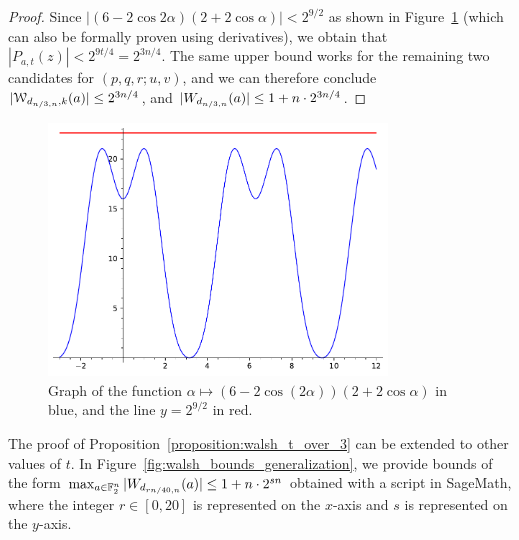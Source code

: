 \documentclass[11pt]{llncs}
\begin{document}
\begin{proof}
    
    Since $|(6-2\cos2\alpha)(2+2\cos\alpha)|<2^{9/2}$ as shown in Figure~\ref{fig:trigo_bound} (which can also be formally proven using derivatives), we obtain that $|P_{a,t}(z)|<2^{9t/4}=2^{3n/4}$. 
    The same upper bound works for the remaining two candidates for $(p,q,r;u,v)$, and we can therefore conclude $|\mathcal{W}_{d_{n/3,n},k}(a)|\leq 2^{3n/4}$, and $|W_{d_{n/3,n}}(a)|\leq 1+n\cdot 2^{3n/4}$.
\end{proof}

\begin{figure}
	\centering
	\includegraphics[width=9cm]{trigo_bound.pdf}
	\caption{Graph of the function $\alpha\mapsto(6-2\cos(2\alpha))(2+2\cos\alpha)$ in blue, and the line $y=2^{9/2}$ in red.}
    \label{fig:trigo_bound}
\end{figure}



\begin{remark}
    The proof of Proposition~\ref{proposition:walsh_t_over_3} can be extended to other values of $t$. 
    In Figure~\ref{fig:walsh_bounds_generalization}, we provide bounds of the form $\max_{a\in\mathbb{F}_2^n}|W_{d_{ r n/40,n}}(a)|\leq 1+n\cdot 2^{ s n}$ obtained with a script in \textsf{SageMath}, where the integer $r \in[0,20]$ is represented on the $x$-axis and $s$ is represented on the $y$-axis. 
\end{remark}
\end{document}
